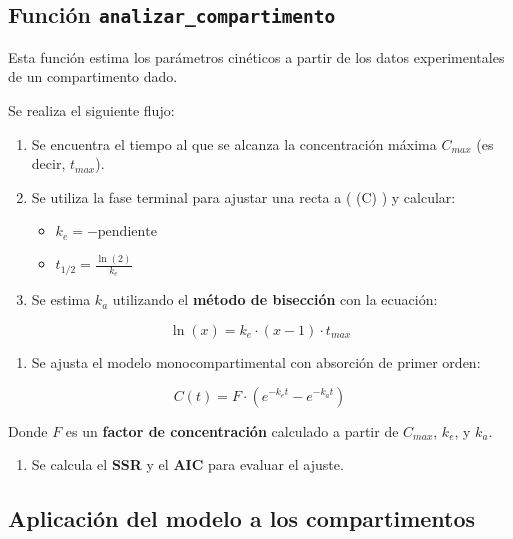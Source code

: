 \documentclass[11pt]{article}
\providecommand{\tightlist}{%
      \setlength{\itemsep}{0pt}\setlength{\parskip}{0pt}}
\begin{document}
    \subsection{\texorpdfstring{Función
\texttt{analizar\_compartimento}}{Función analizar\_compartimento}}\label{funciuxf3n-analizar_compartimento}

Esta función estima los parámetros cinéticos a partir de los datos
experimentales de un compartimento dado.

Se realiza el siguiente flujo:

\begin{enumerate}
\def\labelenumi{\arabic{enumi}.}
\tightlist
\item
  Se encuentra el tiempo al que se alcanza la concentración máxima
  \(C_{max}\) (es decir, \(t_{max}\)).
\item
  Se utiliza la fase terminal para ajustar una recta a ( \ln(C) ) y
  calcular:

  \begin{itemize}
  \tightlist
  \item
    \(k_e = -\text{pendiente}\)
  \item
    \(t_{1/2} = \frac{\ln(2)}{k_e}\)
  \end{itemize}
\item
  Se estima \(k_a\) utilizando el \textbf{método de bisección} con la
  ecuación:
\end{enumerate}

\[
\ln(x) = k_e \cdot (x - 1) \cdot t_{max}
\]

\begin{enumerate}
\def\labelenumi{\arabic{enumi}.}
\setcounter{enumi}{3}
\tightlist
\item
  Se ajusta el modelo monocompartimental con absorción de primer orden:
\end{enumerate}

\[
C(t) = F \cdot \left(e^{-k_e t} - e^{-k_a t} \right)
\]

Donde \(F\) es un \textbf{factor de concentración} calculado a partir de
\(C_{max}\), \(k_e\), y \(k_a\).

\begin{enumerate}
\def\labelenumi{\arabic{enumi}.}
\setcounter{enumi}{4}
\tightlist
\item
  Se calcula el \textbf{SSR} y el \textbf{AIC} para evaluar el ajuste.
\end{enumerate}

    \subsection{Aplicación del modelo a los
compartimentos}\label{aplicaciuxf3n-del-modelo-a-los-compartimentos}
\end{document}
